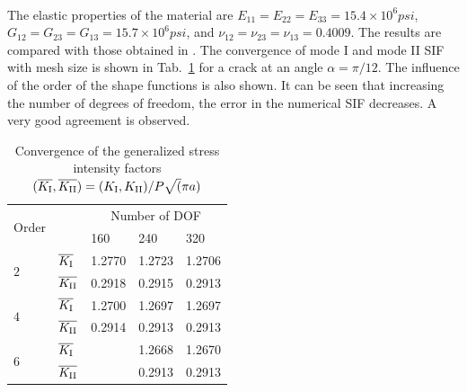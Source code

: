 \paragraph{}
The elastic properties of the material are $E_{11} = E_{22}= E_{33}=15.4\times 10^6 psi$, $G_{12} = G_{23} = G_{13} = 15.7 \times 10^6 psi$, and $\nu_{12} = \nu_{23} = \nu_{13} = 0.4009$.
The results are compared with those obtained in \cite{Banks2005}.
The convergence of mode \RN{1} and mode \RN{2} SIF with mesh size is shown in Tab.~\ref{iso_tab:angled_crack_convergence} for a crack at an angle $\alpha = \pi/12$.
The influence of the order of the shape functions is also shown.
It can be seen that increasing the number of degrees of freedom, the error in the numerical SIF decreases.
A very good agreement is observed.

\begin{table}
\caption{Convergence of the generalized stress intensity factors $
    (\overline{K_{\mathrm I}}, \overline{K_{\mathrm{II}}}) =
    (K_{\mathrm I},K_{\mathrm{II}}) /
    P\sqrt(\pi a)
    $}
\label{iso_tab:angled_crack_convergence}
\begin{tabularx}{\textwidth}{XXXXX}
    \toprule
    \multirow{2}{*}{Order}& & \multicolumn{3}{c}{Number of DOF} \\
    \cmidrule{3-5}
    & & 160 & 240 & 320 \\
    \multirow{2}{*}{$2$}    &   $\overline{K_{\mathrm I}}$   &   1.2770  &   1.2723  &   1.2706  \\
                            &   $\overline{K_{\mathrm{II}}}$   &   0.2918  &   0.2915  &   0.2913  \\
    \multirow{2}{*}{$4$}    &   $\overline{K_{\mathrm I}}$   &   1.2700  &   1.2697  &   1.2697  \\
                            &   $\overline{K_{\mathrm{II}}}$   &   0.2914  &   0.2913  &   0.2913  \\
    \multirow{2}{*}{$6$}    &   $\overline{K_{\mathrm I}}$   &           &   1.2668  &   1.2670  \\
                            &   $\overline{K_{\mathrm{II}}}$   &           &   0.2913  &   0.2913  \\                           
    \midrule
    \bottomrule
\end{tabularx}
\end{table}

